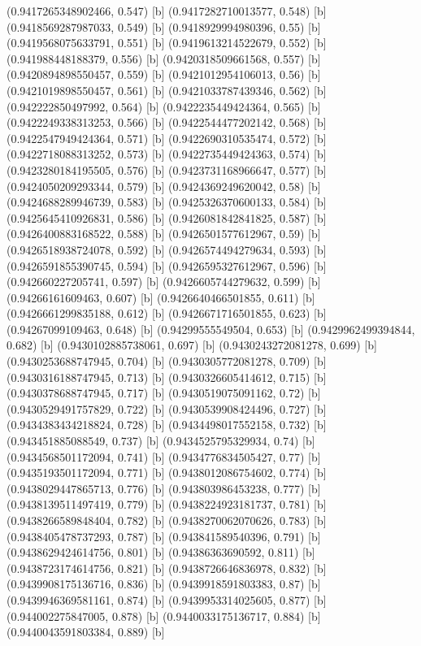 {{{(0.9417265348902466, 0.547) [b] 
(0.9417282710013577, 0.548) [b] 
(0.9418569287987033, 0.549) [b] 
(0.9418929994980396, 0.55) [b] 
(0.9419568075633791, 0.551) [b] 
(0.9419613214522679, 0.552) [b] 
(0.941988448188379, 0.556) [b] 
(0.9420318509661568, 0.557) [b] 
(0.9420894898550457, 0.559) [b] 
(0.9421012954106013, 0.56) [b] 
(0.9421019898550457, 0.561) [b] 
(0.9421033787439346, 0.562) [b] 
(0.942222850497992, 0.564) [b] 
(0.9422235449424364, 0.565) [b] 
(0.9422249338313253, 0.566) [b] 
(0.9422544477202142, 0.568) [b] 
(0.9422547949424364, 0.571) [b] 
(0.9422690310535474, 0.572) [b] 
(0.9422718088313252, 0.573) [b] 
(0.9422735449424363, 0.574) [b] 
(0.9423280184195505, 0.576) [b] 
(0.9423731168966647, 0.577) [b] 
(0.9424050209293344, 0.579) [b] 
(0.9424369249620042, 0.58) [b] 
(0.9424688289946739, 0.583) [b] 
(0.9425326370600133, 0.584) [b] 
(0.9425645410926831, 0.586) [b] 
(0.9426081842841825, 0.587) [b] 
(0.9426400883168522, 0.588) [b] 
(0.9426501577612967, 0.59) [b] 
(0.9426518938724078, 0.592) [b] 
(0.9426574494279634, 0.593) [b] 
(0.9426591855390745, 0.594) [b] 
(0.9426595327612967, 0.596) [b] 
(0.942660227205741, 0.597) [b] 
(0.9426605744279632, 0.599) [b] 
(0.94266161609463, 0.607) [b] 
(0.9426640466501855, 0.611) [b] 
(0.9426661299835188, 0.612) [b] 
(0.9426671716501855, 0.623) [b] 
(0.94267099109463, 0.648) [b] 
(0.94299555549504, 0.653) [b] 
(0.9429962499394844, 0.682) [b] 
(0.9430102885738061, 0.697) [b] 
(0.9430243272081278, 0.699) [b] 
(0.9430253688747945, 0.704) [b] 
(0.9430305772081278, 0.709) [b] 
(0.9430316188747945, 0.713) [b] 
(0.9430326605414612, 0.715) [b] 
(0.9430378688747945, 0.717) [b] 
(0.9430519075091162, 0.72) [b] 
(0.9430529491757829, 0.722) [b] 
(0.9430539908424496, 0.727) [b] 
(0.9434383434218824, 0.728) [b] 
(0.9434498017552158, 0.732) [b] 
(0.943451885088549, 0.737) [b] 
(0.9434525795329934, 0.74) [b] 
(0.9434568501172094, 0.741) [b] 
(0.9434776834505427, 0.77) [b] 
(0.9435193501172094, 0.771) [b] 
(0.9438012086754602, 0.774) [b] 
(0.9438029447865713, 0.776) [b] 
(0.943803986453238, 0.777) [b] 
(0.9438139511497419, 0.779) [b] 
(0.9438224923181737, 0.781) [b] 
(0.9438266589848404, 0.782) [b] 
(0.9438270062070626, 0.783) [b] 
(0.9438405478737293, 0.787) [b] 
(0.943841589540396, 0.791) [b] 
(0.9438629424614756, 0.801) [b] 
(0.94386363690592, 0.811) [b] 
(0.9438723174614756, 0.821) [b] 
(0.9438726646836978, 0.832) [b] 
(0.9439908175136716, 0.836) [b] 
(0.9439918591803383, 0.87) [b] 
(0.9439946369581161, 0.874) [b] 
(0.9439953314025605, 0.877) [b] 
(0.944002275847005, 0.878) [b] 
(0.9440033175136717, 0.884) [b] 
(0.9440043591803384, 0.889) [b] 
}}}
